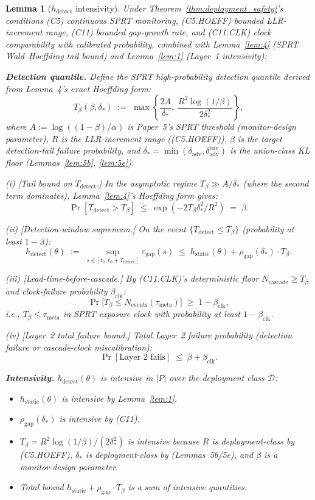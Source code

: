 \documentclass{article}
\newtheorem{lemma}{Lemma}
\newcommand{\deltaadv}{\delta_{\mathrm{adv}}}
\newcommand{\deltastar}{\delta_{*}}
\newcommand{\rhogap}{\rho_{\mathrm{gap}}}
\newcommand{\epsgap}{\varepsilon_{\mathrm{gap}}}
\newcommand{\Tbeta}{T_{\beta}}
\newcommand{\Ncasc}{N_{\mathrm{cascade}}}
\newcommand{\Nev}{N_{\mathrm{events}}}
\newcommand{\bclk}{\beta_{\mathrm{clk}}}
\begin{document}
\begin{lemma}[$h_{\mathrm{detect}}$ intensivity]
\label{lem:6}
Under Theorem~\ref{thm:deployment_safety}'s conditions (C5)
continuous SPRT monitoring, (C5.HOEFF) bounded LLR-increment range,
(C11) bounded gap-growth rate, and (C11.CLK) clock comparability
with calibrated probability, combined with Lemma~\ref{lem:4}
(SPRT Wald--Hoeffding tail bound) and Lemma~\ref{lem:1}
(Layer~1 intensivity):

\textbf{Detection quantile.}  Define the SPRT high-probability
detection quantile derived from Lemma~4's exact Hoeffding form:
\[
  \Tbeta(\beta, \deltastar) \;:=\;
  \max\!\left\{\frac{2A}{\deltastar},\;
  \frac{R^2 \log(1/\beta)}{2 \deltastar^2}\right\},
\]
where $A := \log((1-\beta)/\alpha)$ is Paper~5's SPRT threshold
(monitor-design parameter), $R$ is the LLR-increment range
((C5.HOEFF)), $\beta$ is the target detection-tail
failure probability, and $\deltastar = \min(\deltaadv,
\delta_{\mathrm{adv}}^{\mathrm{env}})$ is the union-class KL floor
(Lemmas~\ref{lem:5b}, \ref{lem:5e}).

(i) [Tail bound on $T_{\mathrm{detect}}$.]  In the asymptotic
regime $\Tbeta \gg A/\deltastar$ (where the second term dominates),
Lemma~\ref{lem:4}'s Hoeffding form gives:
\[
  \Pr[T_{\mathrm{detect}} > \Tbeta] \;\leq\; \exp(-2 \Tbeta
  \deltastar^2 / R^2) \;=\; \beta.
\]

(ii) [Detection-window supremum.]  On the event
$\{T_{\mathrm{detect}} \leq \Tbeta\}$ (probability at least
$1-\beta$):
\[
  h_{\mathrm{detect}}(\theta) \;:=\;
  \sup_{s \in [t_0, t_0 + T_{\mathrm{detect}}]} \epsgap(s)
  \;\leq\; h_{\mathrm{static}}(\theta) + \rhogap(\deltastar) \cdot
  \Tbeta.
\]

(iii) [Lead-time-before-cascade.]  By (C11.CLK)'s deterministic
floor $\Ncasc \geq \Tbeta$ and clock-failure probability $\bclk$:
\[
  \Pr\bigl[\Tbeta \leq \Nev(\tau_{\mathrm{meta}})\bigr] \;\geq\; 1 -
  \bclk,
\]
i.e., $\Tbeta \leq \tau_{\mathrm{meta}}$ in SPRT exposure clock
with probability at least $1 - \bclk$.

(iv) [Layer~2 total failure bound.]  Total Layer~2 failure
probability (detection failure or cascade-clock miscalibration):
\[
  \Pr[\text{Layer~2 fails}] \;\leq\; \beta + \bclk.
\]

\textbf{Intensivity.}  $h_{\mathrm{detect}}(\theta)$ is intensive
in $|P|$ over the deployment class $\mathcal{D}$:
\begin{itemize}
\item $h_{\mathrm{static}}(\theta)$ is intensive by Lemma~\ref{lem:1}.
\item $\rhogap(\deltastar)$ is intensive by (C11).
\item $\Tbeta = R^2 \log(1/\beta)/(2 \deltastar^2)$ is intensive
  because $R$ is deployment-class by (C5.HOEFF), $\deltastar$ is
  deployment-class by (Lemmas~5b/5e), and $\beta$ is a monitor-design
  parameter.
\item Total bound $h_{\mathrm{static}} + \rhogap \cdot \Tbeta$ is
  a sum of intensive quantities.
\end{itemize}
\end{lemma}
\end{document}

